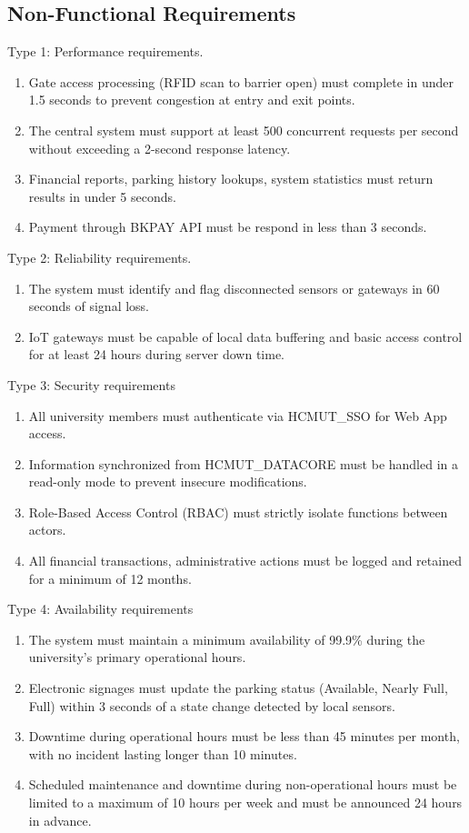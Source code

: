 \subsection{Non-Functional Requirements}
\noindent Type 1: Performance requirements.
\begin{enumerate}
    \item Gate access processing (RFID scan to barrier open) must complete in under 1.5 seconds to prevent congestion at entry and exit points.
    \item The central system must support at least 500 concurrent requests per second without exceeding a 2-second response latency.
    \item Financial reports, parking history lookups, system statistics must return results in under 5 seconds.
    \item Payment through BKPAY API must be respond in less than 3 seconds.
\end{enumerate}
Type 2: Reliability requirements.
\begin{enumerate}
    \item The system must identify and flag disconnected sensors or gateways in 60 seconds of signal loss.
    \item IoT gateways must be capable of local data buffering and basic access control for at least 24 hours during server down time.
\end{enumerate}
Type 3: Security requirements
\begin{enumerate}
    \item All university members must authenticate via HCMUT\_SSO for Web App access.
    \item Information synchronized from HCMUT\_DATACORE must be handled in a read-only mode to prevent insecure modifications.
    \item Role-Based Access Control (RBAC) must strictly isolate functions between actors.
    \item All financial transactions, administrative actions must be logged and retained for a minimum of 12 months.
\end{enumerate}
Type 4: Availability requirements
\begin{enumerate}
    \item The system must maintain a minimum availability of 99.9\% during the university's primary operational hours.
    \item Electronic signages must update the parking status (Available, Nearly Full, Full) within 3 seconds of a state change detected by local sensors.
    \item Downtime during operational hours must be less than 45 minutes per month, with no incident lasting longer than 10 minutes.
    \item Scheduled maintenance and downtime during non-operational hours must be limited to a maximum of 10 hours per week and must be announced 24 hours in advance.
\end{enumerate}
